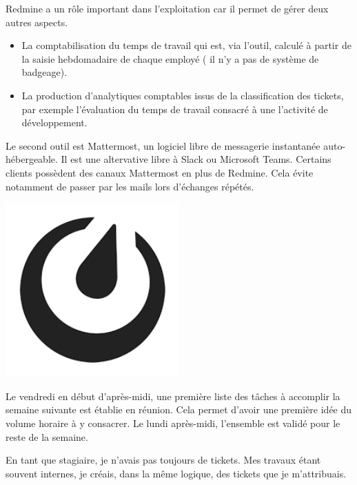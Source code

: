 \documentclass[12pt, a4paper, twoside]{article}
\begin{document}
\gls{Redmine} a un rôle important dans l'exploitation car il permet de gérer deux autres aspects.
\begin{itemize}
    \item La comptabilisation du temps de travail qui est, via l'outil, calculé à partir de la saisie hebdomadaire de chaque employé ( il n'y a pas de système de badgeage).
    \item La production d'analytiques comptables issus de la classification des tickets, par exemple l'évaluation du temps de travail consacré à une l'activité de développement.
\end{itemize}

\noindent%
\begin{minipage}{.7\textwidth}%
Le second outil est Mattermost, un logiciel libre de messagerie instantanée auto-hébergeable.
Il est une altervative libre à \gls{Slack} ou \gls{Microsoft Teams}.
Certains clients possèdent des canaux Mattermost en plus de \gls{Redmine}.
Cela évite notamment de passer par les mails lors d'échanges répétés. \\
\end{minipage}%
\hfill
\begin{minipage}{.3\textwidth}%
\begin{center}
\includegraphics[width=0.5\textwidth]{src/logo_mattermost.png}
\end{center}
\end{minipage}%

Le vendredi en début d'après-midi, une première liste des tâches à accomplir la semaine suivante est établie en réunion.
Cela permet d'avoir une première idée du volume horaire à y consacrer.
Le lundi après-midi, l'ensemble est validé pour le reste de la semaine.

En tant que stagiaire, je n'avais pas toujours de tickets.
Mes travaux étant souvent internes, je créais, dans la même logique, des tickets que je m'attribuais.
\end{document}
